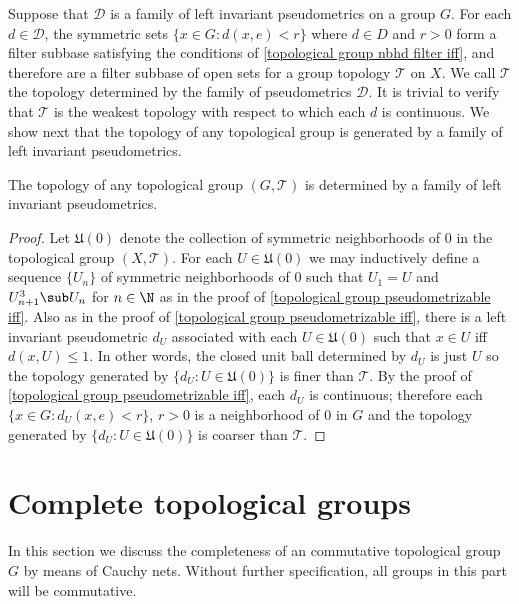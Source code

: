 Suppose that $\mathscr{D}$ is a family of left invariant pseudometrics on a group $G$. For each $d\in\mathscr{D}$, the symmetric sets $\{x\in G:d(x,e)<r\}$ where $d\in D$ and $r>0$ form a filter subbase satisfying the conditions of \cref{topological group nbhd filter iff}, and therefore are a filter subbase of open sets for a group topology $\mathcal{T}$ on $X$. We call $\mathcal{T}$ the topology determined by the family of pseudometrics $\mathscr{D}$. It is trivial to verify that $\mathcal{T}$ is the weakest topology with respect to which each $d$ is continuous. We show next that the topology of any topological group is generated by a family of left invariant pseudometrics.
\begin{proposition}\label{topological group topology determined by metrics}
The topology of any topological group $(G,\mathcal{T})$ is determined by a family of left invariant pseudometrics.
\end{proposition}
\begin{proof}
Let $\mathfrak{U}(0)$ denote the collection of symmetric neighborhoods of $0$ in the topological group $(X,\mathcal{T})$. For each $U\in\mathfrak{U}(0)$ we may inductively define a sequence $\{U_n\}$ of symmetric neighborhoods of $0$ such that $U_1=U$ and $U_{n+1}^3\sub U_n$ for $n\in\N$ as in the proof of \cref{topological group pseudometrizable iff}. Also as in the proof of \cref{topological group pseudometrizable iff}, there is a left invariant pseudometric $d_U$ associated with each $U\in\mathfrak{U}(0)$ such that $x\in U$ iff $d(x,U)\leq 1$. In other words, the closed unit ball determined by $d_U$ is just $U$ so the topology generated by $\{d_U:U\in\mathfrak{U}(0)\}$ is finer than $\mathcal{T}$. By the proof of \cref{topological group pseudometrizable iff}, each $d_U$ is continuous; therefore each $\{x\in G:d_U(x,e)<r\}$, $r>0$ is a neighborhood of $0$ in $G$ and the topology generated by $\{d_U:U\in\mathfrak{U}(0)\}$ is coarser than $\mathcal{T}$. 
\end{proof}
\section{Complete topological groups}
In this section we discuss the completeness of an commutative topological group $G$ by means of Cauchy nets. Without further specification, all groups in this part will be commutative.
